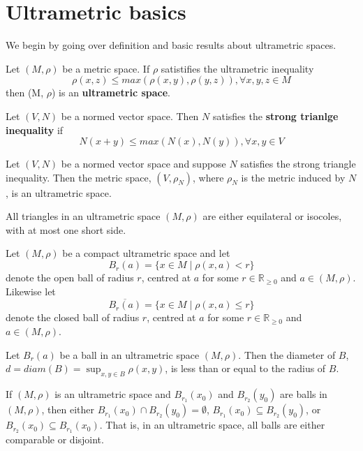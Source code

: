 \section*{Ultrametric basics}


We begin by going over definition and basic results about ultrametric spaces. 
\begin{definition*}
	 Let $(M, \rho)$ be a metric space. If $\rho$ satistifies the ultrametric inequality
	\[\rho(x,z) \leq max{(\rho(x,y), \rho(y,z))}, \forall x,y,z \in M\] 
	then (M, $\rho$) is an \textbf{ultrametric space}.
\end{definition*}

\begin{definition*}
	 Let $(V, N)$ be a normed vector space. Then $N$ satisfies the \textbf{strong trianlge inequality} if
	\[N(x + y) \leq max(N(x), N(y)), \forall x,y \in V \]
\end{definition*}

\begin{proposition*}
	Let $(V,N)$ be a normed vector space and suppose $N$ satisfies the strong triangle inequality. Then the metric space, $(V,\rho_N)$, where $\rho_N$ is the metric induced by $N$, is an ultrametric space.
\end{proposition*}

\begin{proposition*}
	\cite{ar} All triangles in an ultrametric space $(M,\rho)$ are either equilateral or isocoles, with at most one short side. 
\end{proposition*}


\noindent Let $(M, \rho)$ be a compact ultrametric space and let \[B_r(a)=\{x \in M \mid \rho(x,a) < r\}\] denote the open ball of radius $r$, centred at $a$ for some $r \in \mathbb{R}_{\geq 0}$ and $a \in (M,\rho)$. Likewise let \[\overline{ B_r(a)}=\{x \in M \mid \rho(x,a) \leq r\}\]  denote the closed ball of radius $r$, centred at $a$ for some $r \in \mathbb{R}_{\geq 0}$ and $a \in (M,\rho)$.

\begin{proposition*}
	Let $B_r(a)$ be a ball in an ultrametric space $(M,\rho)$. Then the diameter of $B$, $d=diam(B)=\sup_{x,y \in B}{\rho(x,y)}$, is less than or equal to the radius of $B$.    
\end{proposition*}

\begin{proposition*}
	If $(M, \rho)$ is an ultrametric space and $B_{r_1}(x_0)$ and $B_{r_2}(y_0)$ are balls in $(M, \rho)$, then either $B_{r_1}(x_0) \cap B_{r_2}(y_0) = \emptyset$, $B_{r_1}(x_0) \subseteq B_{r_2}(y_0)$, or $B_{r_2}(x_0) \subseteq B_{r_1}(x_0)$. That is, in an ultrametric space, all balls are either comparable or disjoint.
\end{proposition*}

